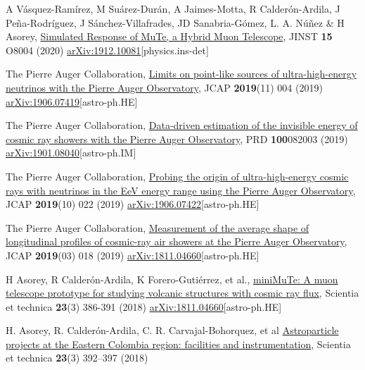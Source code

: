 \begin{etaremune}
\item {} A Vásquez-Ramírez, M Suárez-Durán, A Jaimes-Motta, R Calderón-Ardila, J Peña-Rodríguez, J Sánchez-Villafrades, JD Sanabria-Gómez, L. A. Núñez \& H Asorey, \href{https://doi.org/10.1088/1748-0221/15/08/P08004}{{Simulated Response of MuTe, a Hybrid Muon Telescope}}, JINST {\bf{15}} O8004 (2020) \href{https://arxiv.org/abs/1912.10081}{arXiv:1912.10081}[physics.ins-det]

\item {}The Pierre Auger Collaboration, \href{https://doi.org/10.1088/1475-7516/2019/11/004}{{Limits on point-like sources of ultra-high-energy neutrinos with the Pierre Auger Observatory}}, JCAP {\bf{2019}}(11) 004 (2019) \href{https://arxiv.org/abs/1906.07419}{arXiv:1906.07419}[astro-ph.HE]

\item {}The Pierre Auger Collaboration, \href{https://doi.org/10.1103/PhysRevD.100.082003}{Data-driven estimation of the invisible energy of cosmic ray showers with the Pierre Auger Observatory}, PRD {\bf{100}}082003 (2019) \href{https://arxiv.org/abs/1901.08040}{arXiv:1901.08040}[astro-ph.IM]

\item {}The Pierre Auger Collaboration, \href{https://doi.org/10.1088/1475-7516/2019/10/022}{Probing the origin of ultra-high-energy cosmic rays with neutrinos in the EeV energy range using the Pierre Auger Observatory}, JCAP {\bf{2019}}(10) 022 (2019) \href{https://arxiv.org/abs/1906.07422}{arXiv:1906.07422}[astro-ph.HE]

\item {}The Pierre Auger Collaboration, \href{https://doi.org/10.1088/1475-7516/2019/03/018}{Measurement of the average shape of longitudinal profiles of cosmic-ray air showers at the Pierre Auger Observatory}, JCAP {\bf{2019}}(03) 018 (2019) \href{https://arxiv.org/abs/1811.04660}{arXiv:1811.04660}[astro-ph.HE]

\item {} H Asorey, R Calderón-Ardila, K Forero-Gutiérrez, et al., \href{http://dx.doi.org/10.22517/23447214.17501}{miniMuTe: A muon telescope prototype for studying volcanic structures with cosmic ray flux}, Scientia et technica {\bf{23}}(3) 386-391 (2018) \href{https://arxiv.org/abs/1811.04660}{arXiv:1811.04660}[astro-ph.HE]

\item {}H. Asorey, R. Calderón-Ardila, C. R. Carvajal-Bohorquez, et al \href{http://dx.doi.org/10.22517/23447214.17561}{Astroparticle projects at the Eastern Colombia region: facilities and instrumentation}, Scientia et technica {\bf{23}}(3) 392--397 (2018)




\end{etaremune}
